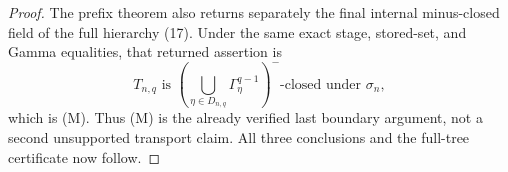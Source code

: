 \begin{proof}
The prefix theorem also returns separately the final internal
minus-closed field of the full hierarchy (17).  Under the same exact stage,
stored-set, and Gamma equalities, that returned assertion is
\[
 T_{n,q}\text{ is }
 \left(\bigcup_{\eta\in D_{n,q}}\Gamma^{q-1}_\eta\right)^-
 \text{-closed under }\sigma_n,
\]
which is (M).  Thus (M) is the already verified last boundary argument,
not a second unsupported transport claim.  All three conclusions and the
full-tree certificate now follow.
\end{proof}
